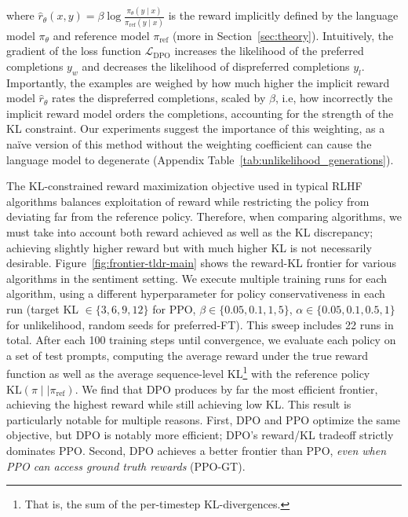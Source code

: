 where $\hat{r}_\theta(x, y) = \beta \log \frac{\pi_\theta(y \mid x)}{\pi_\text{ref}(y \mid x)}$ is the reward implicitly defined by the language model $\pi_\theta$ and reference model $\pi_\text{ref}$ (more in Section~\ref{sec:theory}). Intuitively, the gradient of the loss function $\mathcal{L}_\text{DPO}$ increases the likelihood of the preferred completions $y_w$ and decreases the likelihood of dispreferred completions $y_l$. Importantly, the examples are weighed by how much higher the implicit reward model $\hat{r}_\theta$ rates the dispreferred completions, scaled by $\beta$, i.e, how incorrectly the implicit reward model orders the completions, accounting for the strength of the KL constraint. Our experiments suggest the importance of this weighting, as a na\"ive version of this method without the weighting coefficient can cause the language model to degenerate (Appendix Table~\ref{tab:unlikelihood_generations}).

The KL-constrained reward maximization objective used in typical RLHF algorithms balances exploitation of reward while restricting the policy from deviating far from the reference policy. Therefore, when comparing algorithms, we must take into account both reward achieved as well as the KL discrepancy; achieving slightly higher reward but with much higher KL is not necessarily desirable. Figure~\ref{fig:frontier-tldr-main} shows the reward-KL frontier for various algorithms in the sentiment setting. We execute multiple training runs for each algorithm, using a different hyperparameter for policy conservativeness in each run (target KL $\in\{3,6,9,12\}$ for PPO, $\beta \in \{0.05,0.1,1,5\}$, $\alpha\in\{0.05,0.1,0.5,1\}$ for unlikelihood, random seeds for preferred-FT). This sweep includes 22 runs in total. After each 100 training steps until convergence, we evaluate each policy on a set of test prompts, computing the average reward under the true reward function as well as the average sequence-level KL\footnote{That is, the sum of the per-timestep KL-divergences.} with the reference policy $\text{KL}\left(\pi\mid \mid \pi_\text{ref}\right)$. We find that DPO produces by far the most efficient frontier, achieving the highest reward while still achieving low KL. This result is particularly notable for multiple reasons. First, DPO and PPO optimize the same objective, but DPO is notably more efficient; DPO's reward/KL tradeoff strictly dominates PPO. Second, DPO achieves a better frontier than PPO, \emph{even when PPO can access ground truth rewards} (PPO-GT).

